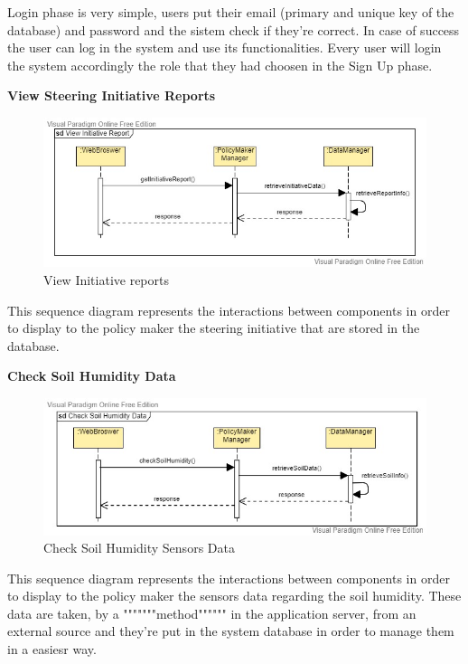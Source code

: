 \documentclass[table, 12pt]{article}
\begin{document}
Login phase is very simple, users put their email (primary and unique key of the database) and password and the sistem check if they're correct.
In case of success the user can log in the system and use its functionalities.
Every user will login the system accordingly the role that they had choosen in the Sign Up phase.

\newpage
\textbf{View Steering Initiative Reports}
\begin{center}
    \begin{figure}[H]
        \includegraphics[scale=0.6, center]{assets/SequenceDiagram/Report.jpg}
        \caption{View Initiative reports}
        \label{fig: report}
    \end{figure}
\end{center}
This sequence diagram represents the interactions between components in order to display to the policy maker the steering initiative that are stored in the database.

\newpage
\textbf{Check Soil Humidity Data}
\begin{center}
    \begin{figure}[H]
        \includegraphics[scale=0.6, center]{assets/SequenceDiagram/Soil.jpg}
        \caption{Check Soil Humidity Sensors Data}
        \label{fig: humidity}
    \end{figure}
\end{center}
This sequence diagram represents the interactions between components in order to display to the policy maker the sensors data regarding the soil humidity.
These data are taken, by a """""""method"""""" in the application server, from an external source and they're put in the system database in order to manage them in a easiesr way.   
\end{document}
